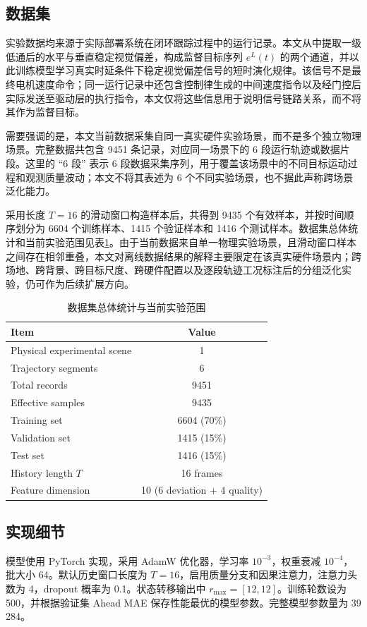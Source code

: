 \documentclass[journal]{IEEEtran}
\newcommand{\legacy}{e^{L}}
\begin{document}
\subsection{数据集}
实验数据均来源于实际部署系统在闭环跟踪过程中的运行记录。本文从中提取一级低通后的水平与垂直稳定视觉偏差，构成监督目标序列 $\legacy(t)$ 的两个通道，并以此训练模型学习真实时延条件下稳定视觉偏差信号的短时演化规律。该信号不是最终电机速度命令；同一运行记录中还包含控制律生成的中间速度指令以及经门控后实际发送至驱动层的执行指令，本文仅将这些信息用于说明信号链路关系，而不将其作为监督目标。

需要强调的是，本文当前数据采集自同一真实硬件实验场景，而不是多个独立物理场景。完整数据共包含 9451 条记录，对应同一场景下的 6 段运行轨迹或数据片段。这里的 ``6 段'' 表示 6 段数据采集序列，用于覆盖该场景中的不同目标运动过程和观测质量波动；本文不将其表述为 6 个不同实验场景，也不据此声称跨场景泛化能力。

采用长度 $T=16$ 的滑动窗口构造样本后，共得到 9435 个有效样本，并按时间顺序划分为 6604 个训练样本、1415 个验证样本和 1416 个测试样本。数据集总体统计和当前实验范围见表\ref{tab:dataset}。由于当前数据来自单一物理实验场景，且滑动窗口样本之间存在相邻重叠，本文对离线数据结果的解释主要限定在该真实硬件场景内；跨场地、跨背景、跨目标尺度、跨硬件配置以及逐段轨迹工况标注后的分组泛化实验，仍可作为后续扩展方向。

\begin{table}[H]
\centering
\caption{数据集总体统计与当前实验范围}
\label{tab:dataset}
\begin{tabular}{lc}
\toprule
\textbf{Item} & \textbf{Value} \\
\midrule
Physical experimental scene & 1 \\
Trajectory segments & 6 \\
Total records & 9451 \\
Effective samples & 9435 \\
Training set & 6604 (70\%) \\
Validation set & 1415 (15\%) \\
Test set & 1416 (15\%) \\
History length $T$ & 16 frames \\
Feature dimension & 10 (6 deviation + 4 quality) \\
\bottomrule
\end{tabular}
\end{table}

\subsection{实现细节}
模型使用 PyTorch 实现，采用 AdamW 优化器，学习率 $10^{-3}$，权重衰减 $10^{-4}$，批大小 64。默认历史窗口长度为 $T=16$，启用质量分支和因果注意力，注意力头数为 4，dropout 概率为 0.1。状态转移输出中 $r_{\max}=[12,12]$。训练轮数设为 500，并根据验证集 Ahead MAE 保存性能最优的模型参数。完整模型参数量为 39 284。
\end{document}
